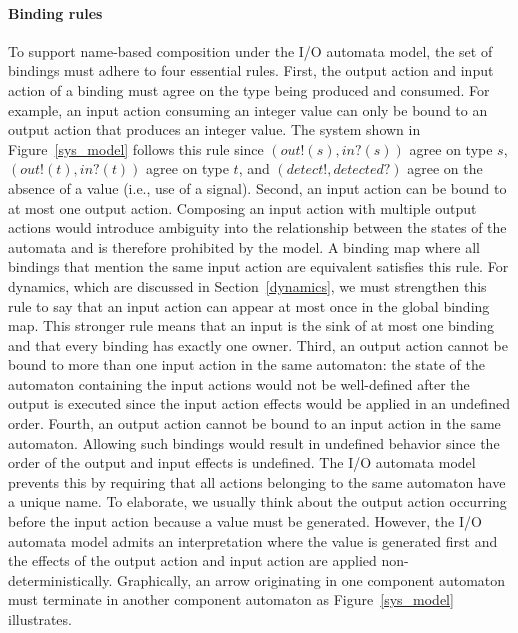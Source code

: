 \paragraph*{Binding rules}
To support name-based composition under the I/O automata model, the set of bindings must adhere to four essential rules.
First, the output action and input action of a binding must agree on the type being produced and consumed.
For example, an input action consuming an integer value can only be bound to an output action that produces an integer value.
The system shown in Figure~\ref{sys_model} follows this rule since $(out!(s), in?(s))$ agree on type $s$, $(out!(t), in?(t))$ agree on type $t$, and $(detect!, detected?)$ agree on the absence of a value (i.e., use of a signal).
Second, an input action can be bound to at most one output action.
Composing an input action with multiple output actions would introduce ambiguity into the relationship between the states of the automata and is therefore prohibited by the model.
A binding map where all bindings that mention the same input action are equivalent satisfies this rule.
For dynamics, which are discussed in Section~\ref{dynamics}, we must strengthen this rule to say that an input action can appear at most once in the global binding map.
This stronger rule means that an input is the sink of at most one binding and that every binding has exactly one owner.
Third, an output action cannot be bound to more than one input action in the same automaton:  the state of the automaton containing the input actions would not be well-defined after the output is executed since the input action effects would be applied in an undefined order.
Fourth, an output action cannot be bound to an input action in the same automaton.
Allowing such bindings would result in undefined behavior since the order of the output and input effects is undefined.
The I/O automata model prevents this by requiring that all actions belonging to the same automaton have a unique name.
To elaborate, we usually think about the output action occurring before the input action because a value must be generated.
However, the I/O automata model admits an interpretation where the value is generated first and the effects of the output action and input action are applied non-deterministically.
Graphically, an arrow originating in one component automaton must terminate in another component automaton as Figure~\ref{sys_model} illustrates.

